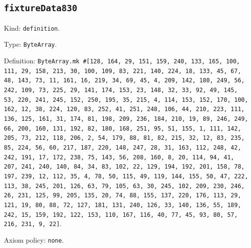 \documentclass[11pt]{article}
\begin{document}
\subsection*{\texttt{fixtureData830}}
\noindent Kind: \texttt{definition}.\par
\noindent Type: \texttt{ByteArray}.\par
\noindent Definition: \texttt{ByteArray.mk \#[128, 164, 29, 151, 159, 240, 133, 165, 100, 111, 29, 158, 213, 30, 100, 109, 83, 221, 140, 224, 18, 133, 45, 67, 48, 143, 73, 11, 161, 16, 219, 34, 69, 45, 4, 209, 142, 180, 249, 56, 242, 109, 73, 225, 29, 141, 174, 153, 23, 148, 32, 33, 92, 49, 145, 53, 220, 241, 245, 152, 250, 195, 35, 215, 4, 114, 153, 152, 170, 100, 162, 12, 38, 224, 120, 83, 252, 41, 251, 248, 106, 44, 210, 223, 111, 136, 125, 161, 31, 174, 81, 198, 209, 236, 184, 210, 19, 89, 246, 249, 66, 200, 160, 131, 192, 82, 180, 168, 251, 95, 51, 155, 1, 111, 142, 205, 73, 212, 118, 206, 2, 54, 179, 88, 81, 82, 215, 32, 12, 83, 235, 85, 224, 56, 60, 217, 187, 220, 148, 247, 28, 31, 163, 112, 248, 42, 242, 191, 17, 172, 238, 75, 143, 56, 208, 160, 8, 20, 114, 94, 41, 207, 241, 240, 140, 84, 34, 83, 102, 22, 129, 194, 192, 201, 158, 78, 197, 239, 12, 112, 35, 4, 78, 50, 115, 49, 119, 144, 155, 50, 47, 222, 113, 38, 245, 201, 126, 63, 79, 105, 63, 30, 245, 102, 209, 230, 246, 26, 231, 125, 99, 205, 135, 20, 74, 88, 155, 137, 220, 176, 113, 29, 121, 19, 80, 88, 72, 127, 181, 131, 240, 126, 33, 140, 136, 55, 189, 242, 15, 159, 192, 122, 153, 110, 167, 116, 40, 77, 45, 93, 80, 57, 216, 231, 9, 22]}.\par
\noindent Axiom policy: \texttt{none}.\par
\end{document}
